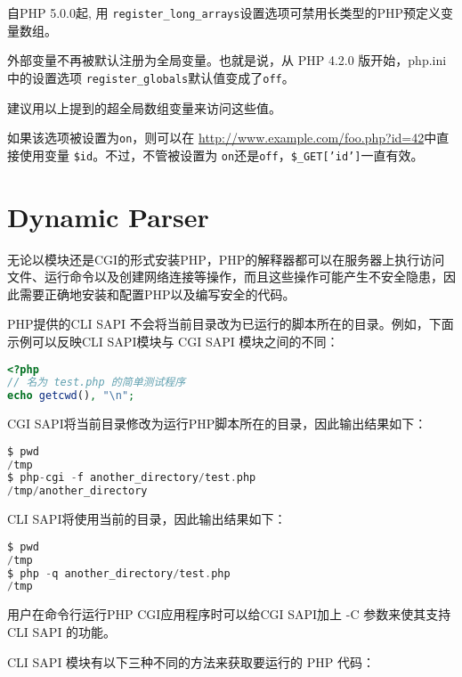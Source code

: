 自PHP 5.0.0起, 用 \texttt{register\_long\_arrays}设置选项可禁用长类型的PHP预定义变量数组。


\begin{compactitem}
\item 外部变量不再被默认注册为全局变量。也就是说，从 PHP 4.2.0 版开始，php.ini 中的设置选项 \texttt{register\_globals}默认值变成了\texttt{off}。

\end{compactitem}

建议用以上提到的超全局数组变量来访问这些值。

如果该选项被设置为\texttt{on}，则可以在 \url{http://www.example.com/foo.php?id=42}中直接使用变量 \texttt{\$id}。不过，不管被设置为 \texttt{on}还是\texttt{off}，\texttt{\$\_GET['id']}一直有效。



\section{Dynamic Parser}

无论以模块还是CGI的形式安装PHP，PHP的解释器都可以在服务器上执行访问文件、运行命令以及创建网络连接等操作，而且这些操作可能产生不安全隐患，因此需要正确地安装和配置PHP以及编写安全的代码。

PHP提供的CLI SAPI 不会将当前目录改为已运行的脚本所在的目录。例如，下面示例可以反映CLI SAPI模块与 CGI SAPI 模块之间的不同：


\begin{lstlisting}[language=PHP]
<?php
// 名为 test.php 的简单测试程序
echo getcwd(), "\n";
\end{lstlisting}

CGI SAPI将当前目录修改为运行PHP脚本所在的目录，因此输出结果如下：

\begin{lstlisting}[language=PHP]
$ pwd
/tmp
$ php-cgi -f another_directory/test.php
/tmp/another_directory
\end{lstlisting}

CLI SAPI将使用当前的目录，因此输出结果如下：


\begin{lstlisting}[language=PHP]
$ pwd
/tmp
$ php -q another_directory/test.php
/tmp
\end{lstlisting}

用户在命令行运行PHP CGI应用程序时可以给CGI SAPI加上 -C 参数来使其支持 CLI SAPI 的功能。

CLI SAPI 模块有以下三种不同的方法来获取要运行的 PHP 代码：

